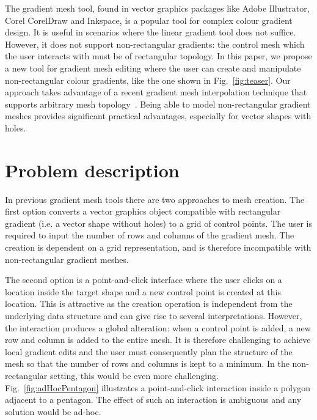 \documentclass{egpubl}
\newcommand{\note}[3]{{\color{#2}\textbf{#1: #3}}}
\newcommand{\john}[1]{\note{JohnKa}{RubineRed}{#1}}
\begin{document}
	The gradient mesh tool, found in vector graphics packages like Adobe Illustrator, Corel CorelDraw and Inkspace, is a popular tool for complex colour gradient design. It is useful in scenarios where the linear gradient tool does not suffice. However, it does not support non-rectangular gradients: the control mesh which the user interacts with must be of rectangular topology. In this paper, we propose a new tool for gradient mesh editing where the user can create and manipulate non-rectangular colour gradients, like the one shown in Fig.~\ref{fig:teaser}. Our approach takes advantage of a recent gradient mesh interpolation technique that supports arbitrary mesh topology~\cite{Lieng:2016}. Being able to model non-rectangular gradient meshes provides significant practical advantages, especially for vector shapes with holes.
	
	
	\section{Problem description}
	\label{sec:overview}
	
	In previous gradient mesh tools there are two approaches to mesh creation. The first option converts a vector graphics object compatible with rectangular gradient (i.e. a vector shape without holes) to a grid of control points. The user is required to input the number of rows and columns of the gradient mesh. The creation is dependent on a grid representation, and is therefore incompatible with non-rectangular gradient meshes.
	
	The second option is a point-and-click interface where the user clicks on a location inside the target shape and a new control point is created at this location. This is attractive as the creation operation is independent from the underlying data structure and can give rise to several interpretations. However, the interaction produces a global alteration: when a control point is added, a new row and column is added to the entire mesh. It is therefore challenging to achieve local gradient edits and the user must consequently plan the structure of the mesh so that the number of rows and columns is kept to a minimum. In the non-rectangular setting, this would be even more challenging. Fig.~\ref{fig:adHocPentagon} illustrates a point-and-click interaction inside a polygon adjacent to a pentagon. The effect of such an interaction is ambiguous and any solution would be ad-hoc.
	
\end{document}
